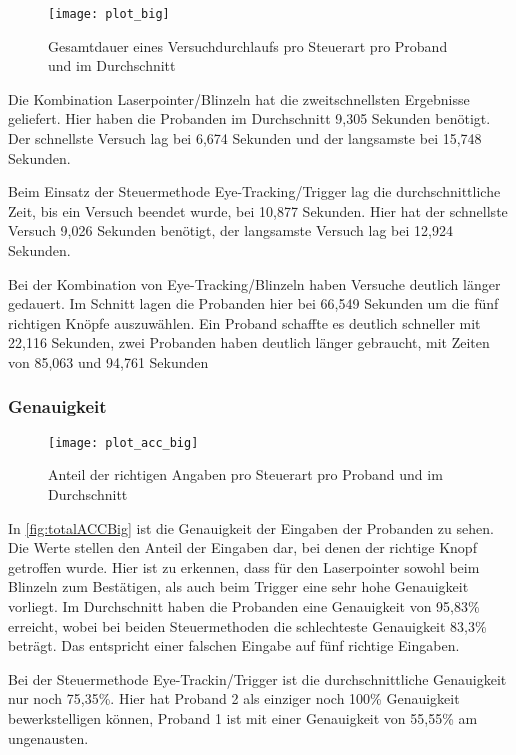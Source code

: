 \begin{figure}[!htbp]
	\centering
	\texttt{[image: plot\_big]}
	\caption[Gesamtdauer eines Versuchdurchlaufs pro Steuerart pro Proband und im Durchschnitt]{Gesamtdauer eines Versuchdurchlaufs pro Steuerart pro Proband und im Durchschnitt}
	\label{fig:totalTimesBig}
\end{figure}

Die Kombination Laserpointer/Blinzeln hat die zweitschnellsten Ergebnisse geliefert. Hier haben die Probanden im Durchschnitt 9,305 Sekunden benötigt. Der schnellste Versuch lag bei 6,674 Sekunden und der langsamste bei 15,748 Sekunden. 

Beim Einsatz der Steuermethode Eye-Tracking/Trigger lag die durchschnittliche Zeit, bis ein Versuch beendet wurde, bei 10,877 Sekunden. Hier hat der schnellste Versuch 9,026 Sekunden benötigt, der langsamste Versuch lag bei 12,924 Sekunden.

Bei der Kombination von Eye-Tracking/Blinzeln haben Versuche deutlich länger gedauert. Im Schnitt lagen die Probanden hier bei 66,549 Sekunden um die fünf richtigen Knöpfe auszuwählen. Ein Proband schaffte es deutlich schneller mit 22,116 Sekunden, zwei Probanden haben deutlich länger gebraucht, mit Zeiten von 85,063 und 94,761 Sekunden

\subsubsection{Genauigkeit}

\begin{figure}[!htbp]
	\centering
	\texttt{[image: plot\_acc\_big]}
	\caption[Anteil der richtigen Angaben pro Steuerart pro Proband und im Durchschnitt]{Anteil der richtigen Angaben pro Steuerart pro Proband und im Durchschnitt}
	\label{fig:totalACCBig}
\end{figure}
In \autoref{fig:totalACCBig} ist die Genauigkeit der Eingaben der Probanden zu sehen. Die Werte stellen den Anteil der Eingaben dar, bei denen der richtige Knopf getroffen wurde. Hier ist zu erkennen, dass  für den Laserpointer sowohl beim Blinzeln zum Bestätigen, als auch beim Trigger eine sehr hohe Genauigkeit vorliegt. Im Durchschnitt haben die Probanden eine Genauigkeit von 95,83\% erreicht, wobei bei beiden Steuermethoden die schlechteste Genauigkeit 83,3\% beträgt. Das entspricht einer falschen Eingabe auf fünf richtige Eingaben.

Bei der Steuermethode Eye-Trackin/Trigger ist die durchschnittliche Genauigkeit nur noch 75,35\%. Hier hat Proband 2 als einziger noch 100\% Genauigkeit bewerkstelligen können, Proband 1 ist mit einer Genauigkeit von 55,55\% am ungenausten. 

